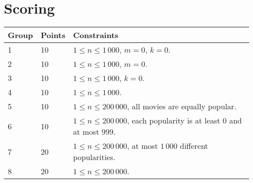 \section*{Scoring}
\begin{tabular}{|l|l|l|}
\hline
Group & Points & Constraints \\ \hline
1     & 10   & $1 \leq n \leq 1\,000$, $m = 0$, $k = 0$. \\ \hline
2     & 10   & $1 \leq n \leq 1\,000$, $m = 0$. \\ \hline
3     & 10   & $1 \leq n \leq 1\,000$, $k = 0$. \\ \hline
4     & 10   & $1 \leq n \leq 1\,000$. \\ \hline
5     & 10   & $1 \leq n \leq 200\,000$, all movies are equally popular. \\ \hline
6     & 10   & $1 \leq n \leq 200\,000$, each popularity is at least $0$ and at most $999$. \\ \hline
7     & 20   & $1 \leq n \leq 200\,000$, at most $1\,000$ different popularities. \\ \hline
8     & 20   & $1 \leq n \leq 200\,000$. \\ \hline
\end{tabular}
